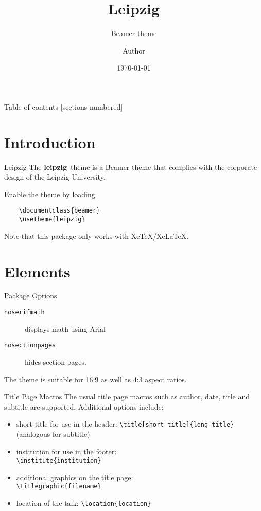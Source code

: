 \documentclass[noserifmath,aspectratio=169]{beamer}
\title[Leipzig]{Leipzig}
\subtitle[Beamer Theme]{Beamer theme}
\author{Author}
\institute{Institute}
\date{\today}
\newcommand{\themename}{\textbf{leipzig}~}
\begin{document}
\maketitle

\begin{frame}{Table of contents}
  [sections numbered]
  \tableofcontents[hideallsubsections]
\end{frame}

\section{Introduction}

\begin{frame}[fragile]{Leipzig}
The \themename theme is a Beamer theme that complies with the corporate design of the Leipzig University.

Enable the theme by loading
\begin{verbatim}
    \documentclass{beamer}
    \usetheme{leipzig}
\end{verbatim}

Note that this package only works with XeTeX/XeLaTeX.
\end{frame}

\section{Elements}
\begin{frame}[fragile]{Package Options}
\begin{description}
\item[\texttt{noserifmath}] displays math using Arial
\item[\texttt{nosectionpages}] hides section pages.
\end{description}
The theme is suitable for 16:9 as well as 4:3 aspect ratios.
\end{frame}

\begin{frame}[fragile]{Title Page Macros}
The usual title page macros such as author, date, title and subtitle are supported.
Additional options include:
\begin{itemize}
\item short title for use in the header: \verb+\title[short title]{long title}+ (analogous for subtitle)
\item institution for use in the footer: \\ \verb+\institute{institution}+
\item additional graphics on the title page: \\ \verb+\titlegraphic{filename}+
\item location of the talk: \verb+\location{location}+
\end{itemize}
\end{frame}
\end{document}

